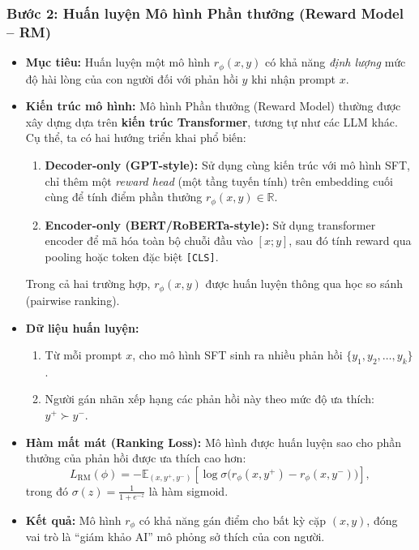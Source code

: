\subsubsection*{Bước 2: Huấn luyện Mô hình Phần thưởng (Reward Model – RM)}

\begin{itemize}
    \item \textbf{Mục tiêu:} Huấn luyện một mô hình \( r_{\phi}(x, y) \) có khả năng \emph{định lượng} mức độ hài lòng của con người đối với phản hồi \( y \) khi nhận prompt \( x \).

    \item \textbf{Kiến trúc mô hình:}  
    Mô hình Phần thưởng (Reward Model) thường được xây dựng dựa trên \textbf{kiến trúc Transformer}, tương tự như các LLM khác.  
    Cụ thể, ta có hai hướng triển khai phổ biến:
    \begin{enumerate}
        \item \textbf{Decoder-only (GPT-style):} Sử dụng cùng kiến trúc với mô hình SFT, chỉ thêm một \emph{reward head} (một tầng tuyến tính) trên embedding cuối cùng để tính điểm phần thưởng \( r_{\phi}(x, y) \in \mathbb{R} \).
        \item \textbf{Encoder-only (BERT/RoBERTa-style):} Sử dụng transformer encoder để mã hóa toàn bộ chuỗi đầu vào \([x; y]\), sau đó tính reward qua pooling hoặc token đặc biệt \texttt{[CLS]}.
    \end{enumerate}
    Trong cả hai trường hợp, \( r_{\phi}(x, y) \) được huấn luyện thông qua học so sánh (pairwise ranking).

    \item \textbf{Dữ liệu huấn luyện:}
    \begin{enumerate}
        \item Từ mỗi prompt \( x \), cho mô hình SFT sinh ra nhiều phản hồi \( \{y_1, y_2, \dots, y_k\} \).
        \item Người gán nhãn xếp hạng các phản hồi này theo mức độ ưa thích: \( y^+ \succ y^- \).
    \end{enumerate}

    \item \textbf{Hàm mất mát (Ranking Loss):}
    Mô hình được huấn luyện sao cho phần thưởng của phản hồi được ưa thích cao hơn:
    \[
        L_{\text{RM}}(\phi)
        = - \mathbb{E}_{(x, y^+, y^-)} \left[
            \log \sigma \big( r_{\phi}(x, y^+) - r_{\phi}(x, y^-) \big)
        \right],
    \]
    trong đó \( \sigma(z) = \frac{1}{1 + e^{-z}} \) là hàm sigmoid.
    \item \textbf{Kết quả:} Mô hình \( r_{\phi} \) có khả năng gán điểm cho bất kỳ cặp \((x, y)\), đóng vai trò là “giám khảo AI” mô phỏng sở thích của con người.
\end{itemize}

